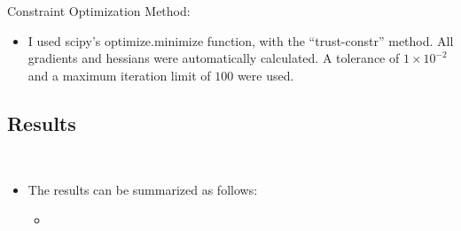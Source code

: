 \documentclass[a4paper]{article}
\begin{document}
Constraint Optimization Method:
\begin{itemize}
    \item I used scipy's optimize.minimize function, with the ``trust-constr''
        method. All gradients and hessians were automatically calculated. A
        tolerance of $1 \times 10^{-2}$ and a maximum iteration limit of
        $100$ were used.
\end{itemize}
\subsection*{Results}
\begin{centering}
    \scalebox{0.6}{} \\
\end{centering}
\begin{itemize}
    \item The results can be summarized as follows:
    \begin{itemize}
        \item 
    \end{itemize}
\end{itemize}
\end{document}
